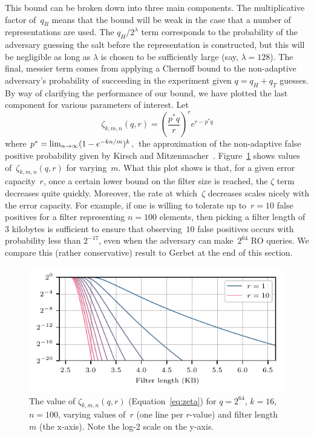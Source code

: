 This bound can be broken down into three main components. The multiplicative
factor of~$q_R$ means that the bound will be weak in the case that a number of
representations are used. The $q_H/2^\lambda$ term corresponds to the
probability of the adversary guessing the salt before the representation is
constructed, but this will be negligible as long as $\lambda$ is chosen to be
sufficiently large (say, $\lambda=128$). The final, messier term comes from
applying a Chernoff bound to the non-adaptive adversary's probability of
succeeding in the experiment given $q = q_H+q_T$ guesses.
%
By way of clarifying the performance of our bound, we have plotted the last
component for various parameters of interest. Let
%
\begin{equation}\label{eq:zeta}
  \zeta_{k,m,n}(q,r) = \left(\frac{p^*q}{r}\right)^re^{r-p^*q}
\end{equation}
%
where
$
  p^* = \lim_{n{\rightarrow}\infty} (1-e^{-kn/m})^k \,,
$
the approximation of the non-adaptive false positive probability given by Kirsch
and Mitzenmacher~\cite{kirsch2006less}.
%
Figure~\ref{fig:bf-bound} shows values
of~$\zeta_{k,m,n}(q,r)$ for varying~$m$.
%
What this plot shows is that, for a given error capacity~$r$, once a certain lower
bound on the filter size is reached, the $\zeta$ term decreases quite quickly.
Moreover, the rate at which~$\zeta$ decreases scales nicely with the error
capacity.  For example, if one is willing to tolerate up to~$r=10$ false
positives for a filter representing $n=100$ elements, then picking a filter
length of $3$ kilobytes is sufficient to ensure that observing~$10$ false
positives occurs with probability less than $2^{-17}$, even when the adversary
can make~$2^{64}$ RO queries.
%
We compare this (rather conservative) result to Gerbet \etal at the end of this section.

\begin{figure}
  \hspace*{-10pt}
  \includegraphics{fig/bf-bound}
  \vspace{-24pt}
  \caption{
    The value of $\zeta_{k,m,n}(q,r)$ (Equation~\ref{eq:zeta}) for $q=2^{64}$,
    $k=16$, $n=100$, varying values of~$r$ (one line per $r$-value) and filter
    length~$m$ (the x-axis).  Note the log-2 scale on the y-axis.
  }
  \label{fig:bf-bound}
\end{figure}

